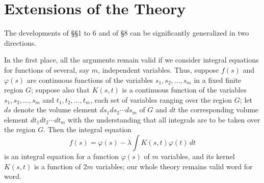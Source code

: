 \section{Extensions of the Theory}
The developments of \S\S1 to 6 and of \S8 can be significantly generalized in two directions.

In the first place, all the arguments remain valid if we consider integral equations for functions of several, say $m$, independent variables. Thus, suppose $f(s)$ and $\varphi(s)$ are continuous functions of the variables $s_1,s_2,\ldots,s_m$ in a fixed finite region $G$; suppose also that $K(s,t)$ is a continuous function of the variables $s_1,s_2,\ldots,s_m$ and $t_1,t_2,\ldots,t_m$, each set of variables ranging over the region $G$; let $ds$ denote the volume element $ds_1ds_2\cdots ds_m$ of $G$ and $dt$ the corresponding volume element $dt_1dt_2\cdots dt_m$ with the understanding that all integrals are to be taken over the region $G$. Then the integral equation
\[
f(s)=\varphi(s)-\lambda\int K(s,t)\varphi(t)\,dt
\]
is an integral equation for a function $\varphi(s)$ of $m$ variables, and its kernel $K(s,t)$ is a function of $2m$ variables; our whole theory remains valid word for word.

